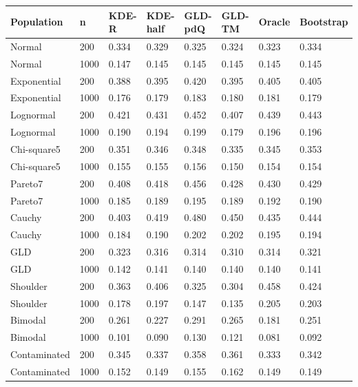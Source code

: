 \begin{tabular}{llllllll}
\toprule
Population & n & KDE-R & KDE-half & GLD-pdQ & GLD-TM & Oracle & Bootstrap \\
\midrule
Normal & 200 & 0.334 & 0.329 & 0.325 & 0.324 & 0.323 & 0.334 \\
Normal & 1000 & 0.147 & 0.145 & 0.145 & 0.145 & 0.145 & 0.145 \\
Exponential & 200 & 0.388 & 0.395 & 0.420 & 0.395 & 0.405 & 0.405 \\
Exponential & 1000 & 0.176 & 0.179 & 0.183 & 0.180 & 0.181 & 0.179 \\
Lognormal & 200 & 0.421 & 0.431 & 0.452 & 0.407 & 0.439 & 0.443 \\
Lognormal & 1000 & 0.190 & 0.194 & 0.199 & 0.179 & 0.196 & 0.196 \\
Chi-square5 & 200 & 0.351 & 0.346 & 0.348 & 0.335 & 0.345 & 0.353 \\
Chi-square5 & 1000 & 0.155 & 0.155 & 0.156 & 0.150 & 0.154 & 0.154 \\
Pareto7 & 200 & 0.408 & 0.418 & 0.456 & 0.428 & 0.430 & 0.429 \\
Pareto7 & 1000 & 0.185 & 0.189 & 0.195 & 0.189 & 0.192 & 0.190 \\
Cauchy & 200 & 0.403 & 0.419 & 0.480 & 0.450 & 0.435 & 0.444 \\
Cauchy & 1000 & 0.184 & 0.190 & 0.202 & 0.202 & 0.195 & 0.194 \\
GLD & 200 & 0.323 & 0.316 & 0.314 & 0.310 & 0.314 & 0.321 \\
GLD & 1000 & 0.142 & 0.141 & 0.140 & 0.140 & 0.140 & 0.141 \\
Shoulder & 200 & 0.363 & 0.406 & 0.325 & 0.304 & 0.458 & 0.424 \\
Shoulder & 1000 & 0.178 & 0.197 & 0.147 & 0.135 & 0.205 & 0.203 \\
Bimodal & 200 & 0.261 & 0.227 & 0.291 & 0.265 & 0.181 & 0.251 \\
Bimodal & 1000 & 0.101 & 0.090 & 0.130 & 0.121 & 0.081 & 0.092 \\
Contaminated & 200 & 0.345 & 0.337 & 0.358 & 0.361 & 0.333 & 0.342 \\
Contaminated & 1000 & 0.152 & 0.149 & 0.155 & 0.162 & 0.149 & 0.149 \\
\bottomrule
\end{tabular}
